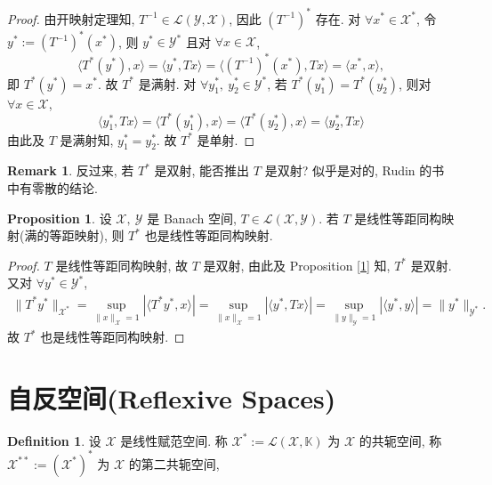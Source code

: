 \documentclass[a4paper,11pt]{article}
\theoremstyle{definition}
\newtheorem{proposition}[theorem]{Proposition}
\newtheorem{remark}[theorem]{Remark}
\newtheorem{definition}[theorem]{Definition}
\begin{document}
\begin{proof} 
    由开映射定理知, $ T^{-1} \in \mathscr{L}(\mathcal{Y}, \mathcal{X}) $, 因此 $ (T^{-1})^* $ 存在.
    对 $ \forall x^* \in \mathcal{X}^* $, 令 $ y^* := (T^{-1})^* (x^*) $,
    则 $ y^* \in \mathcal{Y}^* $ 且对 $ \forall x \in \mathcal{X} $,
    $$
        \langle T^* (y^*), x \rangle 
            = \langle y^*, T x \rangle
            = \langle (T^{-1})^* (x^*), T x \rangle 
            = \langle x^*, x \rangle,
    $$
    即 $ T^* (y^*) = x^* $. 故 $ T^* $ 是满射.
    对 $ \forall y_1^*,\ y_2^* \in \mathcal{Y}^* $, 若 $ T^* (y_1^*) = T^* (y_2^*) $, 
    则对 $ \forall x \in \mathcal{X} $,
    $$
        \langle y_1^*, T x \rangle 
            = \langle T^* (y_1^*), x \rangle 
            = \langle T^* (y_2^*), x \rangle 
            = \langle y_2^*, T x \rangle 
    $$
    由此及 $ T $ 是满射知, $ y_1^* = y_2^* $. 故 $ T^* $ 是单射.
\end{proof}

\begin{remark}
    反过来, 若 $ T^* $ 是双射, 能否推出 $ T $ 是双射? 似乎是对的, Rudin 的书中有零散的结论.
\end{remark}

\begin{proposition} \label{5}
    设 $ \mathcal{X},\ \mathcal{Y} $ 是 Banach 空间, $ T \in \mathscr{L}(\mathcal{X}, \mathcal{Y}) $. 
    若 $ T $ 是线性等距同构映射(满的等距映射), 则 $ T^* $ 也是线性等距同构映射.
\end{proposition}

\begin{proof}
     $ T $ 是线性等距同构映射, 故 $ T $ 是双射, 由此及 Proposition \ref{1} 知, $ T^* $ 是双射.
    又对 $ \forall y^* \in \mathcal{Y}^* $,
    \begin{align*}
        \| T^* y^* \|_{\mathcal{X}^*}
            = \sup_{\| x \|_\mathcal{X} = 1} |\langle T^* y^*, x \rangle|
            = \sup_{\| x \|_\mathcal{X} = 1} |\langle  y^*, T x \rangle|
            = \sup_{\| y \|_\mathcal{Y} = 1} |\langle  y^*, y \rangle|
            = \| y^* \|_{\mathcal{Y}^*}.
    \end{align*}
    故 $ T^* $ 也是线性等距同构映射.
\end{proof}

\section{自反空间(Reflexive Spaces)}

\begin{definition}
    设 $ \mathcal{X} $ 是线性赋范空间. 
    称 $ \mathcal{X}^* := \mathscr{L}(\mathcal{X}, \mathbb{K}) $ 为 $ \mathcal{X} $ 的共轭空间, 
    称 $ \mathcal{X}^{**} := (\mathcal{X}^*)^* $ 为 $ \mathcal{X} $ 的第二共轭空间, 
\end{definition}
\end{document}
